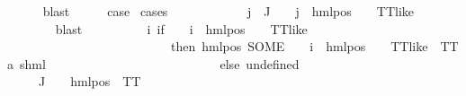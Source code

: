 \begin{isabellebody}
\ \ \ \ \isamarkupfalse%
\ blast\isanewline
\ \ \isamarkupfalse%
\ \isamarkupfalse%
\ {\isacharquery}{\kern0pt}case\ \isamarkupfalse%
{\isacharparenleft}{\kern0pt}cases{\isacharparenright}{\kern0pt}\isanewline
\ \ \ \ \isamarkupfalse%
\ {}\isanewline
\ \ \ \ \isamarkupfalse%
\ {\isachardoublequoteopen}{\isasymforall}j\ {\isasymin}\ J{\isachardot}{\kern0pt}\ {\isacharparenleft}{\kern0pt}{\isasymexists}{\isasymalpha}\ {\isasymchi}{\isachardot}{\kern0pt}\ {\isasymPhi}\ j\ {\isacharequal}{\kern0pt}\ hml{\isacharunderscore}{\kern0pt}pos\ {\isasymalpha}\ {\isasymchi}\ {\isasymand}\ TT{\isacharunderscore}{\kern0pt}like\ {\isasymchi}{\isacharparenright}{\kern0pt}{\isachardoublequoteclose}\ \isanewline
\ \ \ \ \ \ \isamarkupfalse%
\ blast\isanewline
\ \ \ \ \isamarkupfalse%
\ {\isasymPsi}\ \ {\isachardoublequoteopen}{\isasymPsi}\ {\isasymequiv}\ {\isacharparenleft}{\kern0pt}{\isasymlambda}i{\isachardot}{\kern0pt}\ {\isacharparenleft}{\kern0pt}if\ {\isacharparenleft}{\kern0pt}{\isasymexists}{\isasymalpha}\ {\isasymchi}{\isachardot}{\kern0pt}\ {\isasymPhi}\ i\ {\isacharequal}{\kern0pt}\ hml{\isacharunderscore}{\kern0pt}pos\ {\isasymalpha}\ {\isasymchi}\ {\isasymand}\ TT{\isacharunderscore}{\kern0pt}like\ {\isasymchi}{\isacharparenright}{\kern0pt}\isanewline
\ \ \ \ \ \ \ \ \ \ \ \ \ \ \ \ \ \ \ \ \ \ \ \ \ \ then\ {\isacharparenleft}{\kern0pt}hml{\isacharunderscore}{\kern0pt}pos\ {\isacharparenleft}{\kern0pt}SOME\ {\isasymalpha}{\isachardot}{\kern0pt}\ {\isasymexists}{\isasymchi}{\isachardot}{\kern0pt}\ {\isasymPhi}\ i\ {\isacharequal}{\kern0pt}\ hml{\isacharunderscore}{\kern0pt}pos\ {\isasymalpha}\ {\isasymchi}\ {\isasymand}\ TT{\isacharunderscore}{\kern0pt}like\ {\isasymchi}{\isacharparenright}{\kern0pt}\ TT{\isacharparenright}{\kern0pt}{\isacharcolon}{\kern0pt}{\isacharcolon}{\kern0pt}{\isacharparenleft}{\kern0pt}{\isacharprime}{\kern0pt}a{\isacharcomma}{\kern0pt}\ {\isacharprime}{\kern0pt}s{\isacharparenright}{\kern0pt}hml\ \isanewline
\ \ \ \ \ \ \ \ \ \ \ \ \ \ \ \ \ \ \ \ \ \ \ \ \ \ else\ undefined{\isacharparenright}{\kern0pt}{\isacharparenright}{\kern0pt}{\isachardoublequoteclose}\isanewline
\ \ \ \ \isamarkupfalse%
\ {\isachardoublequoteopen}{\isasymforall}{\isasympsi}\ {\isasymin}\ {\isasymPsi}\ {\isacharbackquote}{\kern0pt}\ J{\isachardot}{\kern0pt}\ {\isasymexists}{\isasymalpha}{\isachardot}{\kern0pt}\ {\isasympsi}\ {\isacharequal}{\kern0pt}\ hml{\isacharunderscore}{\kern0pt}pos\ {\isasymalpha}\ TT{\isachardoublequoteclose}\isanewline

\end{isabellebody}
